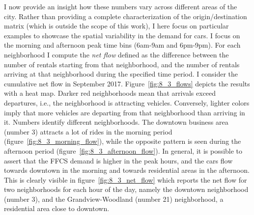 I now provide an insight how these numbers vary across different areas of the city. Rather than providing a complete characterization of the origin/destination matrix (which is outside the scope of this work), I here focus on particular examples to showcase the spatial variability in the demand for cars. I focus on  the morning and afternoon peak time bins (6am-9am and 6pm-9pm). 
For each neighborhood I compute the \textit{net flow} defined as the difference between the number of rentals starting from that neighborhood, and the number of rentals arriving at that neighborhood during the specified time period. I consider the cumulative net flow in September 2017. 
Figure~\ref{fig:8_3_flows} depicts the results with a heat map. Darker red neighborhoods mean that arrivals exceed departures, i.e., the neighborhood is attracting vehicles. Conversely, lighter colors imply that more vehicles are departing from that neighborhood than arriving in it. Numbers identify different neighborhoods.
The downtown business area (number 3) attracts a lot of rides in the morning period (figure~\ref{fig:8_3_morning_flow}), while the opposite pattern is seen during the afternoon period (figure~\ref{fig:8_3_afternoon_flow}). 
In general, it is possible to assert that the FFCS demand is higher in the peak hours, and the cars flow towards downtown in the morning and towards residential areas in the afternoon. 
This is clearly visible in figure~\ref{fig:8_3_net_flow} which reports the net flow for two neighborhoods for each hour of the day, namely the downtown neighborhood (number 3), and the Grandview-Woodland (number 21) neighborhood, a residential area close to downtown.

